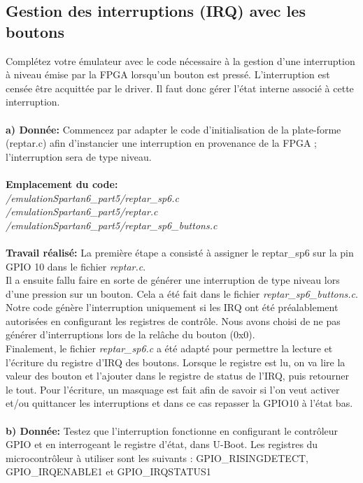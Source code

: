 \subsection{Gestion des interruptions (IRQ) avec les boutons}
Complétez votre émulateur avec le code nécessaire à la gestion d'une interruption à niveau émise par
la FPGA lorsqu'un bouton est pressé. L'interruption est censée être acquittée par le driver. Il faut donc
gérer l'état interne associé à cette interruption. \\\\
\textbf{a) Donnée: }Commencez par adapter le code d'initialisation de la plate-forme (reptar.c) afin d'instancier une
interruption en provenance de la FPGA ; l'interruption sera de type niveau.\\\\
\textbf{Emplacement du code:}\\\textit{/emulationSpartan6\_part5/reptar\_sp6.c}\\
\textit{/emulationSpartan6\_part5/reptar.c}\\
\textit{/emulationSpartan6\_part5/reptar\_sp6\_buttons.c}\\\\
\textbf{Travail réalisé: }La première étape a consisté à assigner le reptar\_sp6 sur la pin GPIO 10 dans le fichier \textit{reptar.c}.\\Il a ensuite fallu faire en sorte de générer une interruption de type niveau lors d'une pression sur un bouton. Cela a été fait dans le fichier \textit{reptar\_sp6\_buttons.c}. Notre code génère l'interruption uniquement si les IRQ ont été préalablement autorisées en configurant les registres de contrôle. Nous avons choisi de ne pas générer d'interruptions lors de la relâche du bouton (0x0).\\
Finalement, le fichier \textit{reptar\_sp6.c} a été adapté pour permettre la lecture et l'écriture du registre d'IRQ des boutons. Lorsque le registre est lu, on va lire la valeur des bouton et l'ajouter dans le registre de status de l'IRQ, puis retourner le tout. Pour l'écriture, un masquage est fait afin de savoir si l'on veut activer et/ou quittancer les interruptions et dans ce cas repasser la GPIO10 à l'état bas.\\\\
\textbf{b) Donnée: }Testez que l'interruption fonctionne en configurant le contrôleur GPIO et en interrogeant le registre
d'état, dans U-Boot. Les registres du microcontrôleur à utiliser sont les suivants :
GPIO\_RISINGDETECT, GPIO\_IRQENABLE1 et GPIO\_IRQSTATUS1
